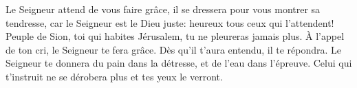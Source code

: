 Le Seigneur attend de vous faire grâce, il se dressera pour vous montrer sa tendresse,
	car le Seigneur est le Dieu juste: heureux tous ceux qui l’attendent!
Peuple de Sion, toi qui habites Jérusalem, tu ne pleureras jamais plus.
	À l’appel de ton cri, le Seigneur te fera grâce.
	Dès qu’il t’aura entendu, il te répondra.
Le Seigneur te donnera du pain dans la détresse, et de l’eau dans l’épreuve.
	Celui qui t’instruit ne se dérobera plus et tes yeux le verront.
